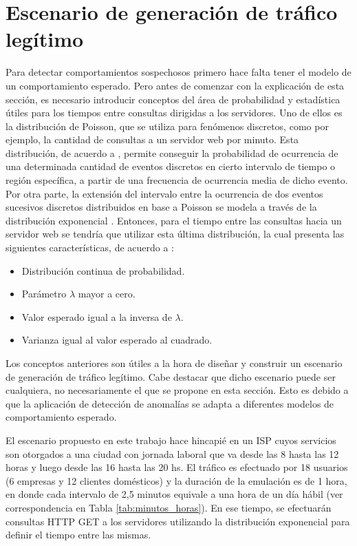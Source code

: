 \section {Escenario de generación de tráfico
  legítimo} \label{sec:traffic_legitim}

Para detectar comportamientos sospechosos primero hace falta tener el modelo de
un comportamiento esperado. Pero antes de comenzar con la explicación de esta
sección, es necesario introducir conceptos del área de probabilidad y
estadística útiles para los tiempos entre consultas dirigidas a los servidores.
Uno de ellos es la distribución de Poisson, que se utiliza para fenómenos
discretos, como por ejemplo, la cantidad de consultas a un servidor web por
minuto. Esta distribución, de acuerdo a \parencite{poisson}, permite conseguir
la probabilidad de ocurrencia de una determinada cantidad de eventos discretos
en cierto intervalo de tiempo o región específica, a partir de una frecuencia de
ocurrencia media de dicho evento. Por otra parte, la extensión del intervalo
entre la ocurrencia de dos eventos sucesivos discretos distribuidos en base a
Poisson se modela a través de la distribución exponencial
\parencite{distribucion_exponencial}. Entonces, para el tiempo entre las
consultas hacia un servidor web se tendría que utilizar esta última
distribución, la cual presenta las siguientes características, de acuerdo a
\parencite{distribucion_exponencial}:

\begin{itemize}
\item{Distribución continua de probabilidad.}
\item{Parámetro \(\lambda\) mayor a cero.}
\item{Valor esperado igual a la inversa de \(\lambda\).}
\item{Varianza igual al valor esperado al cuadrado.}  
\end{itemize}

Los conceptos anteriores son útiles a la hora de diseñar y construir un
escenario de generación de tráfico legítimo. Cabe destacar que dicho escenario puede ser cualquiera, no necesariamente el que se propone en esta sección. Esto es debido a que la aplicación de detección de anomalías se adapta a diferentes modelos de comportamiento esperado.

El escenario propuesto en este trabajo hace hincapié en un ISP cuyos servicios son otorgados a una ciudad con jornada laboral que va desde las 8 hasta las 12 horas y luego desde las 16 hasta las 20 hs. El tráfico es efectuado por 18 usuarios (6 empresas y 12 clientes domésticos) y la duración de la emulación es de 1 hora, en donde cada intervalo de 2,5 minutos equivale a una hora de un día
hábil (ver correspondencia en Tabla \ref{tab:minutos_horas}). En ese tiempo, se efectuarán consultas HTTP GET a los servidores
utilizando la distribución exponencial para definir el tiempo entre las mismas.


